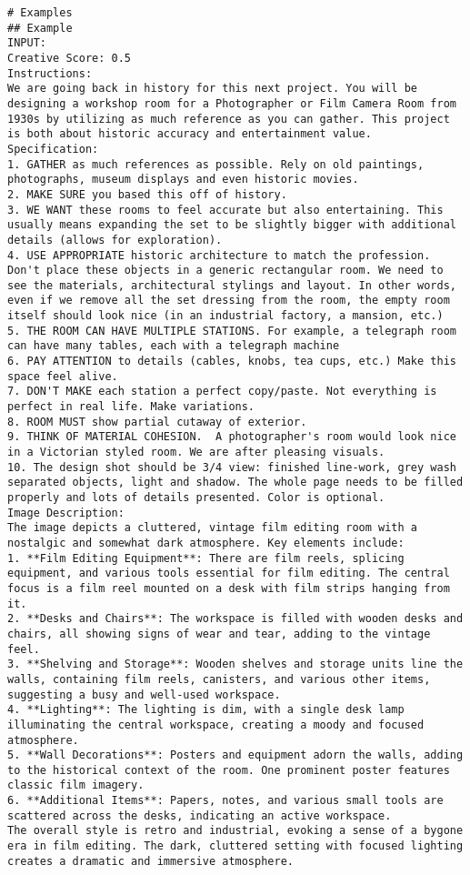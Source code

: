 \begin{lstlisting}
# Examples 
## Example 
INPUT:
Creative Score: 0.5 
Instructions:
We are going back in history for this next project. You will be designing a workshop room for a Photographer or Film Camera Room from 1930s by utilizing as much reference as you can gather. This project is both about historic accuracy and entertainment value.
Specification:
1. GATHER as much references as possible. Rely on old paintings, photographs, museum displays and even historic movies.
2. MAKE SURE you based this off of history.
3. WE WANT these rooms to feel accurate but also entertaining. This usually means expanding the set to be slightly bigger with additional details (allows for exploration).
4. USE APPROPRIATE historic architecture to match the profession. Don't place these objects in a generic rectangular room. We need to see the materials, architectural stylings and layout. In other words, even if we remove all the set dressing from the room, the empty room itself should look nice (in an industrial factory, a mansion, etc.)
5. THE ROOM CAN HAVE MULTIPLE STATIONS. For example, a telegraph room can have many tables, each with a telegraph machine
6. PAY ATTENTION to details (cables, knobs, tea cups, etc.) Make this space feel alive.
7. DON'T MAKE each station a perfect copy/paste. Not everything is perfect in real life. Make variations.
8. ROOM MUST show partial cutaway of exterior.
9. THINK OF MATERIAL COHESION.  A photographer's room would look nice in a Victorian styled room. We are after pleasing visuals.
10. The design shot should be 3/4 view: finished line-work, grey wash separated objects, light and shadow. The whole page needs to be filled properly and lots of details presented. Color is optional.
Image Description:
The image depicts a cluttered, vintage film editing room with a nostalgic and somewhat dark atmosphere. Key elements include:
1. **Film Editing Equipment**: There are film reels, splicing equipment, and various tools essential for film editing. The central focus is a film reel mounted on a desk with film strips hanging from it.    
2. **Desks and Chairs**: The workspace is filled with wooden desks and chairs, all showing signs of wear and tear, adding to the vintage feel.    
3. **Shelving and Storage**: Wooden shelves and storage units line the walls, containing film reels, canisters, and various other items, suggesting a busy and well-used workspace.    
4. **Lighting**: The lighting is dim, with a single desk lamp illuminating the central workspace, creating a moody and focused atmosphere.    
5. **Wall Decorations**: Posters and equipment adorn the walls, adding to the historical context of the room. One prominent poster features classic film imagery.
6. **Additional Items**: Papers, notes, and various small tools are scattered across the desks, indicating an active workspace.
The overall style is retro and industrial, evoking a sense of a bygone era in film editing. The dark, cluttered setting with focused lighting creates a dramatic and immersive atmosphere.


\end{lstlisting}
